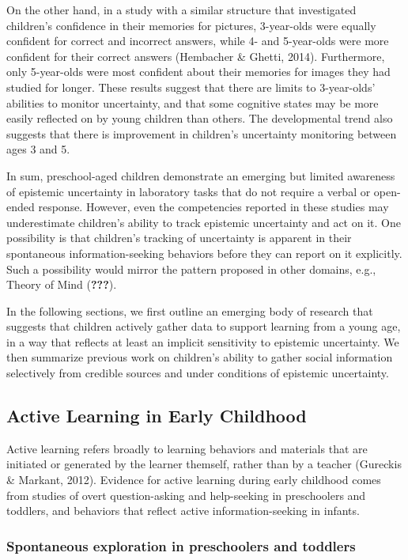 \documentclass[a4paper,man,apacite,floatsintext]{apa6}
\begin{document}
On the other hand, in a study with a similar structure that investigated
children's confidence in their memories for pictures, 3-year-olds were
equally confident for correct and incorrect answers, while 4- and
5-year-olds were more confident for their correct answers (Hembacher \&
Ghetti, 2014). Furthermore, only 5-year-olds were most confident about
their memories for images they had studied for longer. These results
suggest that there are limits to 3-year-olds' abilities to monitor
uncertainty, and that some cognitive states may be more easily reflected
on by young children than others. The developmental trend also suggests
that there is improvement in children's uncertainty monitoring between
ages 3 and 5.

In sum, preschool-aged children demonstrate an emerging but limited
awareness of epistemic uncertainty in laboratory tasks that do not
require a verbal or open-ended response. However, even the competencies
reported in these studies may underestimate children's ability to track
epistemic uncertainty and act on it. One possibility is that children's
tracking of uncertainty is apparent in their spontaneous
information-seeking behaviors before they can report on it explicitly.
Such a possibility would mirror the pattern proposed in other domains,
e.g., Theory of Mind ({\textbf{???}}).

In the following sections, we first outline an emerging body of research
that suggests that children actively gather data to support learning
from a young age, in a way that reflects at least an implicit
sensitivity to epistemic uncertainty. We then summarize previous work on
children's ability to gather social information selectively from
credible sources and under conditions of epistemic uncertainty.

\subsection{Active Learning in Early
Childhood}\label{active-learning-in-early-childhood}

Active learning refers broadly to learning behaviors and materials that
are initiated or generated by the learner themself, rather than by a
teacher (Gureckis \& Markant, 2012). Evidence for active learning during
early childhood comes from studies of overt question-asking and
help-seeking in preschoolers and toddlers, and behaviors that reflect
active information-seeking in infants.

\subsubsection{Spontaneous exploration in preschoolers and
toddlers}\label{spontaneous-exploration-in-preschoolers-and-toddlers}
\end{document}
